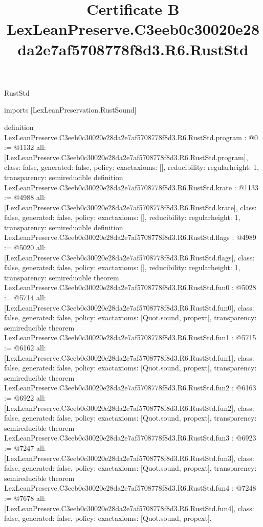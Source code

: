 \begin{lexlean}{RustStd}
\title{Certificate B LexLeanPreserve.C3eeb0c30020e28da2e7af5708778f8d3.R6.RustStd}
\begin{coremodule}
imports [LexLeanPreservation.RustSound]

definition LexLeanPreserve.C3eeb0c30020e28da2e7af5708778f8d3.R6.RustStd.program : @0 := @1132 {
  all: [LexLeanPreserve.C3eeb0c30020e28da2e7af5708778f8d3.R6.RustStd.program],
  class: false,
  generated: false,
  policy: exact{axioms: []},
  reducibility: regular{height: 1},
  transparency: semireducible
}
definition LexLeanPreserve.C3eeb0c30020e28da2e7af5708778f8d3.R6.RustStd.krate : @1133 := @4988 {
  all: [LexLeanPreserve.C3eeb0c30020e28da2e7af5708778f8d3.R6.RustStd.krate],
  class: false,
  generated: false,
  policy: exact{axioms: []},
  reducibility: regular{height: 1},
  transparency: semireducible
}
definition LexLeanPreserve.C3eeb0c30020e28da2e7af5708778f8d3.R6.RustStd.flags : @4989 := @5020 {
  all: [LexLeanPreserve.C3eeb0c30020e28da2e7af5708778f8d3.R6.RustStd.flags],
  class: false,
  generated: false,
  policy: exact{axioms: []},
  reducibility: regular{height: 1},
  transparency: semireducible
}
theorem LexLeanPreserve.C3eeb0c30020e28da2e7af5708778f8d3.R6.RustStd.fun0 : @5028 := @5714 {
  all: [LexLeanPreserve.C3eeb0c30020e28da2e7af5708778f8d3.R6.RustStd.fun0],
  class: false,
  generated: false,
  policy: exact{axioms: [Quot.sound, propext]},
  transparency: semireducible
}
theorem LexLeanPreserve.C3eeb0c30020e28da2e7af5708778f8d3.R6.RustStd.fun1 : @5715 := @6162 {
  all: [LexLeanPreserve.C3eeb0c30020e28da2e7af5708778f8d3.R6.RustStd.fun1],
  class: false,
  generated: false,
  policy: exact{axioms: [Quot.sound, propext]},
  transparency: semireducible
}
theorem LexLeanPreserve.C3eeb0c30020e28da2e7af5708778f8d3.R6.RustStd.fun2 : @6163 := @6922 {
  all: [LexLeanPreserve.C3eeb0c30020e28da2e7af5708778f8d3.R6.RustStd.fun2],
  class: false,
  generated: false,
  policy: exact{axioms: [Quot.sound, propext]},
  transparency: semireducible
}
theorem LexLeanPreserve.C3eeb0c30020e28da2e7af5708778f8d3.R6.RustStd.fun3 : @6923 := @7247 {
  all: [LexLeanPreserve.C3eeb0c30020e28da2e7af5708778f8d3.R6.RustStd.fun3],
  class: false,
  generated: false,
  policy: exact{axioms: [Quot.sound, propext]},
  transparency: semireducible
}
theorem LexLeanPreserve.C3eeb0c30020e28da2e7af5708778f8d3.R6.RustStd.fun4 : @7248 := @7678 {
  all: [LexLeanPreserve.C3eeb0c30020e28da2e7af5708778f8d3.R6.RustStd.fun4],
  class: false,
  generated: false,
  policy: exact{axioms: [Quot.sound, propext]},
}
\end{coremodule}
\end{lexlean}
